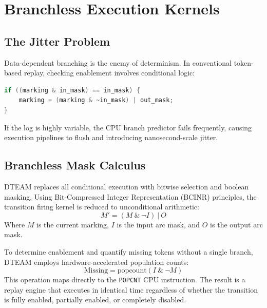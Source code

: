 \chapter{Branchless Execution Kernels}
\section{The Jitter Problem}
Data-dependent branching is the enemy of determinism. In conventional token-based replay, checking enablement involves conditional logic:
\begin{lstlisting}[language=C]
if ((marking & in_mask) == in_mask) {
    marking = (marking & ~in_mask) | out_mask;
}
\end{lstlisting}
If the log is highly variable, the CPU branch predictor fails frequently, causing execution pipelines to flush and introducing nanosecond-scale jitter.

\section{Branchless Mask Calculus}
DTEAM replaces all conditional execution with bitwise selection and boolean masking. Using Bit-Compressed Integer Representation (BCINR) principles, the transition firing kernel is reduced to unconditional arithmetic:
\begin{equation}
M' = (M \ \& \ \neg I) \ | \ O
\end{equation}
Where $M$ is the current marking, $I$ is the input arc mask, and $O$ is the output arc mask. 

To determine enablement and quantify missing tokens without a single branch, DTEAM employs hardware-accelerated population counts:
\begin{equation}
\text{Missing} = \text{popcount}(I \ \& \ \neg M)
\end{equation}
This operation maps directly to the \texttt{POPCNT} CPU instruction. The result is a replay engine that executes in identical time regardless of whether the transition is fully enabled, partially enabled, or completely disabled. 
